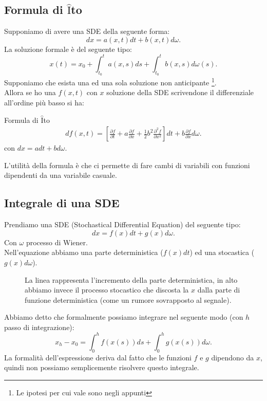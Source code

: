 \subsection{Formula di $\hat{\text{I}}$to}%
\label{sub:Formula di ITO}
Supponiamo di avere una SDE della seguente forma:
\[
    dx = a(x,t) dt + b(x,t) d\omega
.\] 
La soluzione formale è del seguente tipo:
\[
    x(t) = x_0 + \int_{t_0}^{t} a(x,s) ds + \int_{t_0}^{t} b(x,s) d\omega (s)   
.\] 
Supponiamo che esista una ed una sola soluzione non anticipante
\footnote{Le ipotesi per cui vale sono negli appunti}. \\
Allora se ho una $f(x,t)$ con $x$ soluzione della SDE scrivendone il differenziale all'ordine più basso si ha:
\begin{redbox}{Formula di $\hat{\text{I}}$to}
    \[\begin{aligned}
	df(x,t) = 
	\left[\frac{\partial f}{\partial t} + 
	a \frac{\partial f}{\partial x} +
        \frac{1}{2}b^2 \frac{\partial ^2 f}{\partial x^2} \right] dt +
	b\frac{\partial f}{\partial x} d\omega 
    .\end{aligned}\]
    con $dx = adt + bd\omega$.
\end{redbox}
\noindent
L'utilità della formula è che ci permette di fare cambi di variabili con funzioni dipendenti da una variabile casuale.

\subsection{Integrale di una SDE}%
\label{sub:Integrale di una SDE}
Prendiamo una SDE (Stochastical Differential Equation) del seguente tipo:
\[
    dx = f(x) dt + g(x) d\omega
.\] 
Con $\omega$ processo di Wiener. \\
Nell'equazione abbiamo una parte deterministica ($f(x) dt$) ed una stocastica ($g(x)d\omega$).
\begin{figure}[H]
    \centering
    \caption{\scriptsize La linea rappresenta l'incremento della parte deterministica, in alto abbiamo invece il processo stocastico che discosta la $x$ dalla parte di funzione deterministica (come un rumore sovrapposto al segnale).}
    \label{fig:lez_7_int}
\end{figure}
\noindent
Abbiamo detto che formalmente possiamo integrare nel seguente modo (con $h$  passo di integrazione):
\[
    x_h - x_0 = \int_{0}^{h}  f(x(s) ) ds + \int_{0}^{h} g(x(s)) d\omega
.\] 
La formalità dell'espressione deriva dal fatto che le funzioni $f$ e $g$ dipendono da $x$, quindi non possiamo semplicemente risolvere questo integrale.
